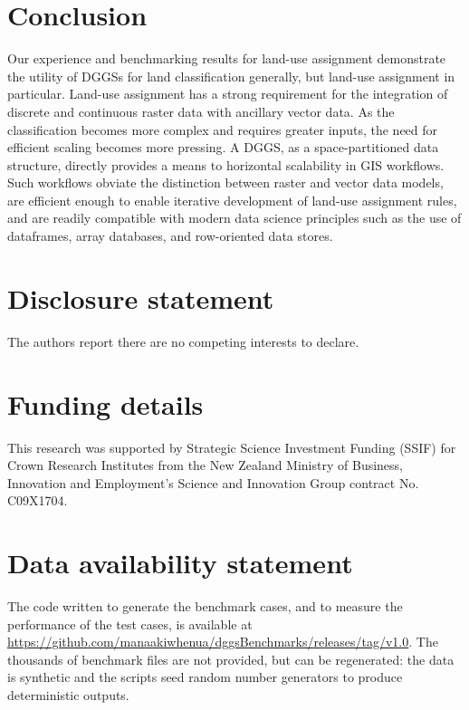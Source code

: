 \documentclass[]{interact}
\theoremstyle{plain}%
\theoremstyle{definition}
\theoremstyle{remark}
\begin{document}
\section{Conclusion}

Our experience and benchmarking results for land-use assignment demonstrate the utility of \acp{DGGS} for land classification generally, but land-use assignment in particular. Land-use assignment has a strong requirement for the integration of discrete and continuous raster data with ancillary vector data. As the classification becomes more complex and requires greater inputs, the need for efficient scaling becomes more pressing. A \ac{DGGS}, as a space-partitioned data structure, directly provides a means to horizontal scalability in \ac{GIS} workflows. Such workflows obviate the distinction between raster and vector data models, are efficient enough to enable iterative development of land-use assignment rules, and are readily compatible with modern data science principles such as the use of dataframes, array databases, and row-oriented data stores.

\clearpage

\section*{Disclosure statement}

The authors report there are no competing interests to declare.

\section*{Funding details}

This research was supported by Strategic Science Investment Funding (SSIF) for Crown Research Institutes from the New Zealand Ministry of Business, Innovation and Employment's Science and Innovation Group contract No. C09X1704.

\section*{Data availability statement}
The code written to generate the benchmark cases, and to measure the performance of the test cases, is available at \url{https://github.com/manaakiwhenua/dggsBenchmarks/releases/tag/v1.0}. The thousands of benchmark files are not provided, but can be regenerated: the data is synthetic and the scripts seed random number generators to produce deterministic outputs.
\end{document}

